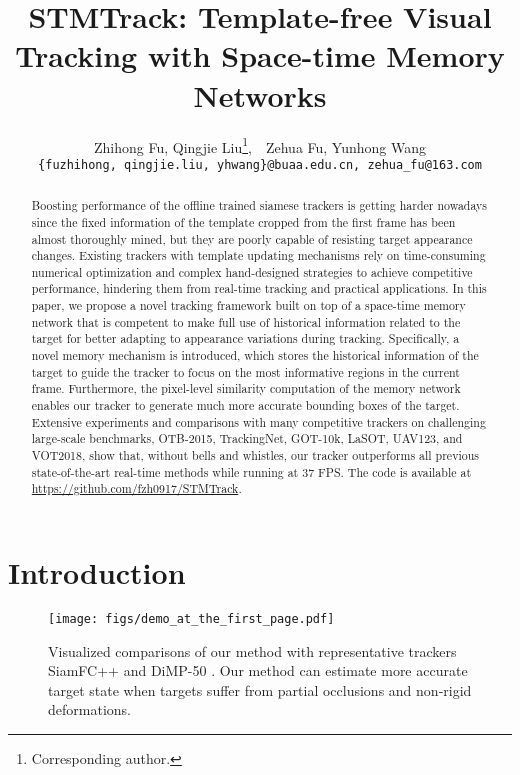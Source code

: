 \documentclass[final]{cvpr}
\begin{document}
\title{STMTrack: Template-free Visual Tracking with Space-time Memory Networks}

\author{Zhihong Fu, Qingjie Liu\thanks{Corresponding author.},\ \ Zehua Fu, Yunhong Wang\\
{\tt\small \{fuzhihong, qingjie.liu, yhwang\}@buaa.edu.cn, zehua\_fu@163.com}
}

\maketitle

\pagestyle{empty}  %
\thispagestyle{empty} %

\begin{abstract}
Boosting performance of the offline trained siamese trackers is getting harder nowadays since the fixed information of the template cropped from the first frame has been almost thoroughly mined, but they are poorly capable of resisting target appearance changes.
Existing trackers with template updating mechanisms rely on time-consuming numerical optimization and complex hand-designed strategies to achieve competitive performance, hindering them from real-time tracking and practical applications.
In this paper, we propose a novel tracking framework built on top of a space-time memory network that is competent to make full use of historical information related to the target for better adapting to appearance variations during tracking.
Specifically, a novel memory mechanism is introduced, which stores the historical information of the target to guide the tracker to focus on the most informative regions in the current frame.
Furthermore, the pixel-level similarity computation of the memory network enables our tracker to generate much more accurate bounding boxes of the target.
Extensive experiments and comparisons with many competitive trackers on challenging large-scale benchmarks, OTB-2015, TrackingNet, GOT-10k, LaSOT, UAV123, and VOT2018, show that, without bells and whistles, our tracker outperforms all previous state-of-the-art real-time methods while running at 37 FPS.
The code is available at \url{https://github.com/fzh0917/STMTrack}.
\end{abstract}

\section{Introduction}
\begin{figure}[t]
    \centering
    \texttt{[image: figs/demo\_at\_the\_first\_page.pdf]}
    \vspace{-1.0em}
    \caption{Visualized comparisons of our method with representative trackers SiamFC++ \cite{xu2020siamfc++} and DiMP-50 \cite{bhat2019learning}. Our method can estimate more accurate target state when targets suffer from partial occlusions and non-rigid deformations.}
    \label{fig:demo_at_the_first_page_fig}
 \vspace{-1.0em}
\end{figure}
\end{document}
